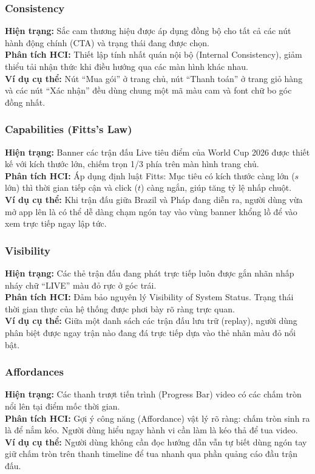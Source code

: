\subsubsection{Consistency}
\textbf{Hiện trạng:} Sắc cam thương hiệu được áp dụng đồng bộ cho tất cả các nút hành động chính (CTA) và trạng thái đang được chọn.\\
\textbf{Phân tích HCI:} Thiết lập tính nhất quán nội bộ (Internal Consistency), giảm thiểu tải nhận thức khi điều hướng qua các màn hình khác nhau.\\
\textbf{Ví dụ cụ thể:} Nút ``Mua gói'' ở trang chủ, nút ``Thanh toán'' ở trang giỏ hàng và các nút ``Xác nhận'' đều dùng chung một mã màu cam và font chữ bo góc đồng nhất.

\subsubsection{Capabilities (Fitts's Law)}
\textbf{Hiện trạng:} Banner các trận đấu Live tiêu điểm của World Cup 2026 được thiết kế với kích thước lớn, chiếm trọn 1/3 phía trên màn hình trang chủ.\\
\textbf{Phân tích HCI:} Áp dụng định luật Fitts: Mục tiêu có kích thước càng lớn ($s$ lớn) thì thời gian tiếp cận và click ($t$) càng ngắn, giúp tăng tỷ lệ nhấp chuột.\\
\textbf{Ví dụ cụ thể:} Khi trận đấu giữa Brazil và Pháp đang diễn ra, người dùng vừa mở app lên là có thể dễ dàng chạm ngón tay vào vùng banner khổng lồ để vào xem trực tiếp ngay lập tức.

\subsubsection{Visibility}
\textbf{Hiện trạng:} Các thẻ trận đấu đang phát trực tiếp luôn được gắn nhãn nhấp nháy chữ ``LIVE'' màu đỏ rực ở góc trái.\\
\textbf{Phân tích HCI:} Đảm bảo nguyên lý Visibility of System Status. Trạng thái thời gian thực của hệ thống được phơi bày rõ ràng trực quan.\\
\textbf{Ví dụ cụ thể:} Giữa một danh sách các trận đấu lưu trữ (replay), người dùng phân biệt được ngay trận nào đang đá trực tiếp dựa vào thẻ nhãn màu đỏ nổi bật.

\subsubsection{Affordances}
\textbf{Hiện trạng:} Các thanh trượt tiến trình (Progress Bar) video có các chấm tròn nổi lên tại điểm mốc thời gian.\\
\textbf{Phân tích HCI:} Gợi ý công năng (Affordance) vật lý rõ ràng: chấm tròn sinh ra là để nắm kéo. Người dùng hiểu ngay hành vi cần làm là kéo thả để tua video.\\
\textbf{Ví dụ cụ thể:} Người dùng không cần đọc hướng dẫn vẫn tự biết dùng ngón tay giữ chấm tròn trên thanh timeline để tua nhanh qua phần quảng cáo đầu trận đấu.

